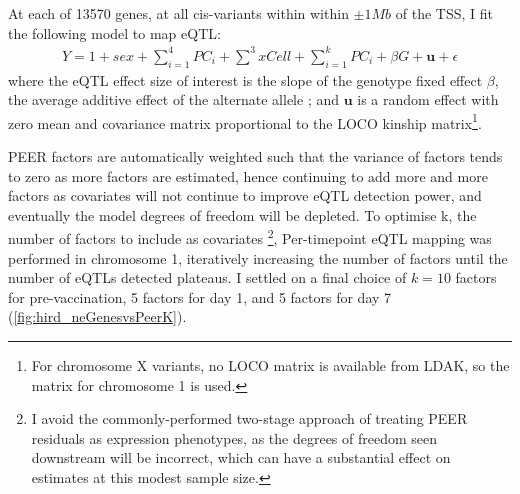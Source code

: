 At each of 13570 genes, at all cis-variants within within $\pm \num{1}{Mb}$ of the \gls{TSS}, I fit the following model to map \gls{eQTL}:
\begin{equation}
\begin{split}
Y = 1 + sex + \sum_{i=1}^{4}{PC_i} + \sum_{}^{3}{xCell} + \sum_{i=1}^{k}{PC_i} + \beta G + \mathbf{u} + \epsilon
\end{split}
\label{eq:hird_reQTL_limix_model}
\end{equation}
where the \gls{eQTL} effect size of interest is the slope of the genotype fixed effect $\beta$, the average additive effect of the alternate allele \autocite{visscher2019Fisher1918Paper};
and $\mathbf{u}$ is a random effect with zero mean and covariance matrix proportional to the \gls{LOCO} kinship matrix\footnote{For chromosome X variants, no \gls{LOCO} matrix is available from LDAK, so the matrix for chromosome 1 is used.}.

PEER factors are automatically weighted such that the variance of factors tends to zero as more factors are estimated, 
hence continuing to add more and more factors as covariates will not continue to improve \gls{eQTL} detection power, and eventually the model degrees of freedom will be depleted.
To optimise k, the number of factors to include as covariates%
\footnote{I avoid the commonly-performed two-stage approach of treating PEER residuals as expression phenotypes, as the degrees of freedom seen downstream will be incorrect, which can have a substantial effect on estimates at this modest sample size.}, 
Per-timepoint \gls{eQTL} mapping was performed in chromosome 1, iteratively increasing the number of factors until the number of \glspl{eQTL} detected plateaus.
I settled on a final choice of $k=10$ factors for pre-vaccination, 5 factors for day 1, and 5 factors for day 7 (\autoref{fig:hird_neGenesvsPeerK}).

